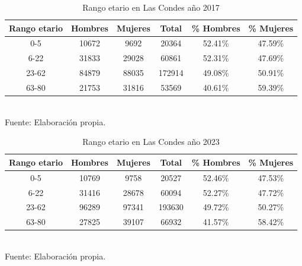 \documentclass[12pt]{article} %
\begin{document}
\begin{table}[H]
    \centering
    \caption{Rango etario en Las Condes año 2017}
    \begin{tabular}{|c|c|c|c|c|c|}
    \hline
    \textbf{Rango etario} & \textbf{Hombres} & \textbf{Mujeres} & \textbf{Total} & \textbf{\% Hombres} & \textbf{\% Mujeres} \\ \hline
    0-5 & 10672 & 9692 & 20364 & 52.41\% & 47.59\% \\ \hline
    6-22 & 31833 & 29028 & 60861 & 52.31\% & 47.69\% \\ \hline
    23-62 & 84879 & 88035 & 172914 & 49.08\% & 50.91\% \\ \hline
    63-80 & 21753 & 31816 & 53569 & 40.61\% & 59.39\% \\ \hline
    \end{tabular}
    \label{Cuadro 5}
    \\Fuente: Elaboración propia.
\end{table}

\begin{table}[H]
    \centering
    \caption{Rango etario en Las Condes año 2023}
    \begin{tabular}{|c|c|c|c|c|c|}
    \hline
    \textbf{Rango etario} & \textbf{Hombres} & \textbf{Mujeres} & \textbf{Total} & \textbf{\% Hombres} & \textbf{\% Mujeres} \\ \hline
    0-5 & 10769 & 9758 & 20527 & 52.46\% & 47.53\% \\ \hline
    6-22 & 31416 & 28678 & 60094 & 52.27\% & 47.72\% \\ \hline
    23-62 & 96289 & 97341 & 193630 & 49.72\% & 50.27\% \\ \hline
    63-80 & 27825 & 39107 & 66932 & 41.57\% & 58.42\% \\ \hline
    \end{tabular}
    \label{Cuadro 6}
    \\Fuente: Elaboración propia.
\end{table}
\end{document}

